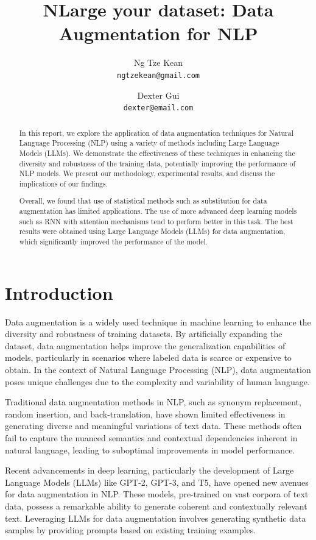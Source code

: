 \documentclass{article}
\title{NLarge your dataset: Data Augmentation for NLP}
\author{
  Ng Tze Kean \\
  \texttt{ngtzekean@gmail.com}
  \and
  Dexter Gui \\
  \texttt{dexter@email.com}
}
\begin{document}
\maketitle

\begin{abstract}

  In this report, we explore the application of data augmentation techniques for
  Natural Language Processing (NLP) using a variety of methods including Large
  Language Models (LLMs). We demonstrate the effectiveness of these techniques in
  enhancing the diversity and robustness of the training data, potentially
  improving the performance of NLP models. We present our methodology,
  experimental results, and discuss the implications of our findings.

  Overall, we found that use of statistical methods such as substitution for data
  augmentation has limited applications. The use of more advanced deep learning
  models such as RNN with attention mechanisms tend to perform better in this
  task. The best results were obtained using Large Language Models (LLMs) for
  data augmentation, which significantly improved the performance of the model.

\end{abstract}

\section{Introduction}

Data augmentation is a widely used technique in machine learning to enhance the
diversity and robustness of training datasets. By artificially expanding the
dataset, data augmentation helps improve the generalization capabilities of
models, particularly in scenarios where labeled data is scarce or expensive to
obtain. In the context of Natural Language Processing (NLP), data augmentation
poses unique challenges due to the complexity and variability of human
language.

Traditional data augmentation methods in NLP, such as synonym replacement,
random insertion, and back-translation, have shown limited effectiveness in
generating diverse and meaningful variations of text data. These methods often
fail to capture the nuanced semantics and contextual dependencies inherent in
natural language, leading to suboptimal improvements in model performance.

Recent advancements in deep learning, particularly the development of Large
Language Models (LLMs) like GPT-2, GPT-3, and T5, have opened new avenues for
data augmentation in NLP. These models, pre-trained on vast corpora of text
data, possess a remarkable ability to generate coherent and contextually
relevant text. Leveraging LLMs for data augmentation involves generating
synthetic data samples by providing prompts based on existing training
examples.
\end{document}
